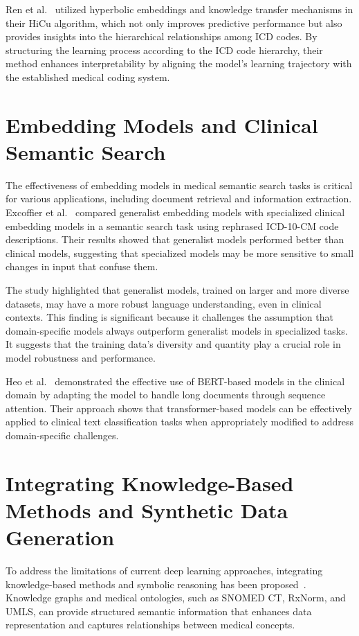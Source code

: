 \documentclass[12pt,a4paper]{report}
\begin{document}
Ren et al.~\cite{ren2022hicu} utilized hyperbolic embeddings and knowledge transfer mechanisms in their HiCu algorithm, which not only improves predictive performance but also provides insights into the hierarchical relationships among ICD codes. By structuring the learning process according to the ICD code hierarchy, their method enhances interpretability by aligning the model's learning trajectory with the established medical coding system.

\section{Embedding Models and Clinical Semantic Search}

The effectiveness of embedding models in medical semantic search tasks is critical for various applications, including document retrieval and information extraction. Excoffier et al.~\cite{excoffier2024generalist} compared generalist embedding models with specialized clinical embedding models in a semantic search task using rephrased ICD-10-CM code descriptions. Their results showed that generalist models performed better than clinical models, suggesting that specialized models may be more sensitive to small changes in input that confuse them.

The study highlighted that generalist models, trained on larger and more diverse datasets, may have a more robust language understanding, even in clinical contexts. This finding is significant because it challenges the assumption that domain-specific models always outperform generalist models in specialized tasks. It suggests that the training data's diversity and quantity play a crucial role in model robustness and performance.

Heo et al.~\cite{heo2022medical} demonstrated the effective use of BERT-based models in the clinical domain by adapting the model to handle long documents through sequence attention. Their approach shows that transformer-based models can be effectively applied to clinical text classification tasks when appropriately modified to address domain-specific challenges.

\section{Integrating Knowledge-Based Methods and Synthetic Data Generation}

To address the limitations of current deep learning approaches, integrating knowledge-based methods and symbolic reasoning has been proposed~\cite{dong2022automated}. Knowledge graphs and medical ontologies, such as SNOMED CT, RxNorm, and UMLS, can provide structured semantic information that enhances data representation and captures relationships between medical concepts.
\end{document}
